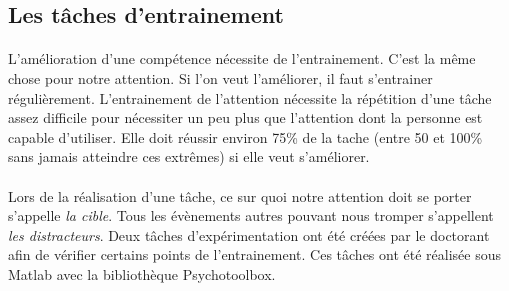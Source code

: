 





\newpage
\subsection{Les tâches d'entrainement}
\label{TrainingSection}

\paragraph{}L'amélioration d'une compétence nécessite de l'entrainement. C'est la même chose pour notre attention. Si l'on veut l'améliorer, il faut s'entrainer régulièrement.
L'entrainement de l'attention nécessite la répétition d'une tâche assez difficile pour nécessiter un peu plus que l'attention dont la personne est capable d'utiliser. Elle doit réussir
environ 75\% de la tache (entre 50 et 100\% sans jamais atteindre ces extrêmes) si elle veut s'améliorer.

\paragraph{}Lors de la réalisation d'une tâche, ce sur quoi notre attention doit se porter s'appelle \emph{la cible}. Tous les évènements autres pouvant nous tromper s'appellent
\emph{les distracteurs}. Deux tâches d'expérimentation ont été créées par le doctorant  afin de vérifier certains points de l'entrainement. Ces tâches ont été
réalisée sous \gls{Matlab} avec la bibliothèque \gls{Psychotoolbox}.




 \newpage




\newpage